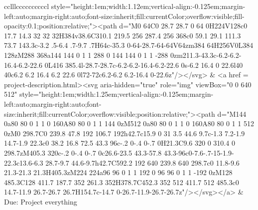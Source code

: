 \documentclass[
]{article}
\begin{document}
\begin{figure*}
\begin{longtable*}{cclllccccccccccl}
style="height:1em;width:1.12em;vertical-align:-0.125em;margin-left:auto;margin-right:auto;font-size:inherit;fill:currentColor;overflow:visible;fill-opacity:0.1;position:relative;"><path d="M0 64C0 28.7 28.7 0 64 0H224V128c0 17.7 14.3 32 32 32H384v38.6C310.1 219.5 256 287.4 256 368c0 59.1 29.1 111.3 73.7 143.3c-3.2 .5-6.4 .7-9.7 .7H64c-35.3 0-64-28.7-64-64V64zm384 64H256V0L384 128zM288 368a144 144 0 1 1 288 0 144 144 0 1 1 -288 0zm211.3-43.3c-6.2-6.2-16.4-6.2-22.6 0L416 385.4l-28.7-28.7c-6.2-6.2-16.4-6.2-22.6 0s-6.2 16.4 0 22.6l40 40c6.2 6.2 16.4 6.2 22.6 0l72-72c6.2-6.2 6.2-16.4 0-22.6z"/></svg> & <a href = project-description.html><svg aria-hidden="true" role="img" viewBox="0 0 640 512" style="height:1em;width:1.25em;vertical-align:-0.125em;margin-left:auto;margin-right:auto;font-size:inherit;fill:currentColor;overflow:visible;position:relative;"><path d="M144 0a80 80 0 1 1 0 160A80 80 0 1 1 144 0zM512 0a80 80 0 1 1 0 160A80 80 0 1 1 512 0zM0 298.7C0 239.8 47.8 192 106.7 192h42.7c15.9 0 31 3.5 44.6 9.7c-1.3 7.2-1.9 14.7-1.9 22.3c0 38.2 16.8 72.5 43.3 96c-.2 0-.4 0-.7 0H21.3C9.6 320 0 310.4 0 298.7zM405.3 320c-.2 0-.4 0-.7 0c26.6-23.5 43.3-57.8 43.3-96c0-7.6-.7-15-1.9-22.3c13.6-6.3 28.7-9.7 44.6-9.7h42.7C592.2 192 640 239.8 640 298.7c0 11.8-9.6 21.3-21.3 21.3H405.3zM224 224a96 96 0 1 1 192 0 96 96 0 1 1 -192 0zM128 485.3C128 411.7 187.7 352 261.3 352H378.7C452.3 352 512 411.7 512 485.3c0 14.7-11.9 26.7-26.7 26.7H154.7c-14.7 0-26.7-11.9-26.7-26.7z"/></svg></a> & Due: Project everything \\ 

\end{longtable*}
\end{figure*}
\end{document}
